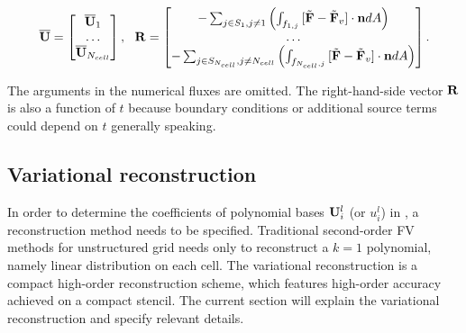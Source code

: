 \documentclass[preprint,12pt]{elsarticle}
\begin{document}
\begin{equation}
    \overline{\mathbf{U}} = \begin{bmatrix}
        \overline{\mathbf{U}}_1 \\
        \dots \\
        \overline{\mathbf{U}}_{N_{cell}}
    \end{bmatrix},\ \
    \mathbf{R} = \begin{bmatrix}
        -\sum_{j\in S_1, j\neq 1}{\left(
            \int_{f_{1,j}}{
                [\tilde{\mathbf{F}} - \tilde{\mathbf{F}}_v] \cdot \mathbf{n}  dA
            }\right)
        }     \\
        \dots \\
        -\sum_{j\in S_{N_{cell}}, j\neq N_{cell}}{\left(
            \int_{f_{N_{cell},j}}{
                [\tilde{\mathbf{F}} - \tilde{\mathbf{F}}_v] \cdot \mathbf{n}  dA
            }\right)
        }
    \end{bmatrix}.
\end{equation}

The arguments in the numerical fluxes are omitted.
The right-hand-side vector $\mathbf{R}$ is also a function of $t$
because boundary conditions or additional source terms
could depend on $t$ generally speaking.




\subsection{Variational reconstruction}
\label{ssec:VR}
In order to determine the coefficients of polynomial bases $\mathbf{U}_i^l$
 (or $u_i^l$) in
, a reconstruction method needs to be specified.
Traditional second-order FV methods for unstructured grid
needs only to reconstruct a $k=1$ polynomial, namely linear
distribution on each cell.
The variational reconstruction \cite{wang2017compact_VR}
is a compact high-order
reconstruction scheme, which features high-order
accuracy achieved on a compact stencil.
The current section will explain the variational reconstruction
and specify relevant details.
\end{document}
